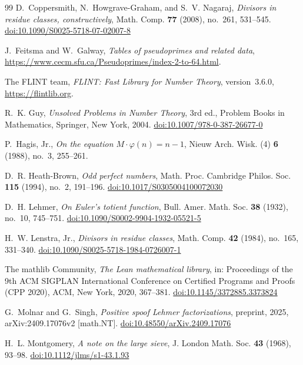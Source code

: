 \documentclass[11pt,reqno]{amsart}
\numberwithin{equation}{section}
\theoremstyle{plain}
\theoremstyle{definition}
\theoremstyle{remark}
\begin{document}
\begin{thebibliography}{99}
D.~Coppersmith, N.~Howgrave-Graham, and S.~V. Nagaraj,
\emph{Divisors in residue classes, constructively},
Math. Comp. \textbf{77} (2008), no.~261, 531--545.
\href{https://doi.org/10.1090/S0025-5718-07-02007-8}{doi:10.1090/S0025-5718-07-02007-8}

J.~Feitsma and W.~Galway,
\emph{Tables of pseudoprimes and related data},
\url{https://www.cecm.sfu.ca/Pseudoprimes/index-2-to-64.html}.

The FLINT team,
\emph{FLINT: Fast Library for Number Theory}, version~3.6.0,
\url{https://flintlib.org}.

R.~K. Guy,
\emph{Unsolved Problems in Number Theory}, 3rd ed.,
Problem Books in Mathematics, Springer, New York, 2004.
\href{https://doi.org/10.1007/978-0-387-26677-0}{doi:10.1007/978-0-387-26677-0}

P.~Hagis, Jr.,
\emph{On the equation $M\cdot\varphi(n)=n-1$},
Nieuw Arch. Wisk. (4) \textbf{6} (1988), no.~3, 255--261.

D.~R. Heath-Brown,
\emph{Odd perfect numbers},
Math. Proc. Cambridge Philos. Soc. \textbf{115} (1994), no.~2, 191--196.
\href{https://doi.org/10.1017/S0305004100072030}{doi:10.1017/S0305004100072030}

D.~H. Lehmer,
\emph{On Euler's totient function},
Bull. Amer. Math. Soc. \textbf{38} (1932), no.~10, 745--751.
\href{https://doi.org/10.1090/S0002-9904-1932-05521-5}{doi:10.1090/S0002-9904-1932-05521-5}

H.~W. Lenstra, Jr.,
\emph{Divisors in residue classes},
Math. Comp. \textbf{42} (1984), no.~165, 331--340.
\href{https://doi.org/10.1090/S0025-5718-1984-0726007-1}{doi:10.1090/S0025-5718-1984-0726007-1}

The mathlib Community,
\emph{The Lean mathematical library},
in: Proceedings of the 9th ACM SIGPLAN International Conference on
Certified Programs and Proofs (CPP 2020), ACM, New York, 2020, 367--381.
\href{https://doi.org/10.1145/3372885.3373824}{doi:10.1145/3372885.3373824}

G.~Molnar and G.~Singh,
\emph{Positive spoof Lehmer factorizations},
preprint, 2025, arXiv:2409.17076v2 [math.NT].
\href{https://doi.org/10.48550/arXiv.2409.17076}{doi:10.48550/arXiv.2409.17076}

H.~L. Montgomery,
\emph{A note on the large sieve},
J. London Math. Soc. \textbf{43} (1968), 93--98.
\href{https://doi.org/10.1112/jlms/s1-43.1.93}{doi:10.1112/jlms/s1-43.1.93}


\end{thebibliography}
\end{document}

